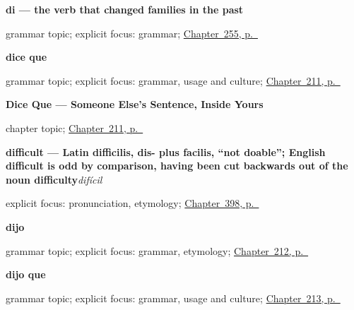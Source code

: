 \noindent\begin{minipage}[t]{\linewidth}
\raggedright
\textbf{di — the verb that changed families in the past}\par
\footnotesize grammar topic; explicit focus: grammar; \hyperref[ch:vi-di]{Chapter~255, p.~\pageref*{ch:vi-di}}
\end{minipage}\par\smallskip

\noindent\begin{minipage}[t]{\linewidth}
\raggedright
\textbf{dice que}\par
\footnotesize grammar topic; explicit focus: grammar, usage and culture; \hyperref[ch:dice-que]{Chapter~211, p.~\pageref*{ch:dice-que}}
\end{minipage}\par\smallskip

\noindent\begin{minipage}[t]{\linewidth}
\raggedright
\textbf{Dice Que --- Someone Else's Sentence, Inside Yours}\par
\footnotesize chapter topic; \hyperref[ch:dice-que]{Chapter~211, p.~\pageref*{ch:dice-que}}
\end{minipage}\par\smallskip

\noindent\begin{minipage}[t]{\linewidth}
\raggedright
\textbf{difficult — Latin difficilis, dis- plus facilis, \textquotedblleft{}not doable\textquotedblright{}; English difficult is odd by comparison, having been cut backwards out of the noun difficulty}\enspace\emph{difícil}\par
\footnotesize explicit focus: pronunciation, etymology; \hyperref[ch:importante-y-facil]{Chapter~398, p.~\pageref*{ch:importante-y-facil}}
\end{minipage}\par\smallskip

\noindent\begin{minipage}[t]{\linewidth}
\raggedright
\textbf{dijo}\par
\footnotesize grammar topic; explicit focus: grammar, etymology; \hyperref[ch:dijo]{Chapter~212, p.~\pageref*{ch:dijo}}
\end{minipage}\par\smallskip

\noindent\begin{minipage}[t]{\linewidth}
\raggedright
\textbf{dijo que}\par
\footnotesize grammar topic; explicit focus: grammar, usage and culture; \hyperref[ch:dijo-que]{Chapter~213, p.~\pageref*{ch:dijo-que}}
\end{minipage}\par\smallskip

